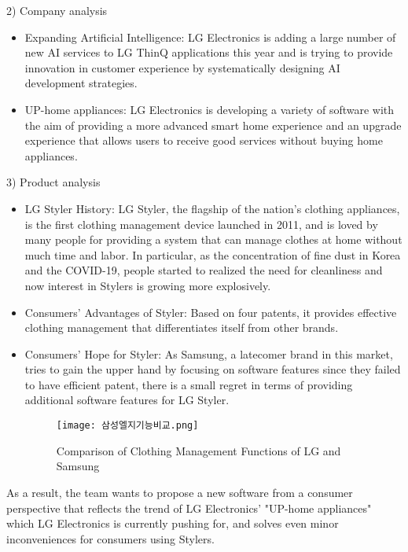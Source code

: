 \documentclass[conference]{IEEEtran}
\begin{document}
2) Company analysis
\begin{itemize}
    \item Expanding Artificial Intelligence: LG Electronics is adding a large number of new AI services to LG ThinQ applications this year and is trying to provide innovation in customer experience by systematically designing AI development strategies.\\
    \item UP-home appliances: LG Electronics is developing a variety of software with the aim of providing a more advanced smart home experience and an upgrade experience that allows users to receive good services without buying home appliances.\\
\end{itemize}

3) Product analysis
\begin{itemize}
    \item LG Styler History: LG Styler, the flagship of the nation's clothing appliances, is the first clothing management device launched in 2011, and is loved by many people for providing a system that can manage clothes at home without much time and labor. In particular, as the concentration of fine dust in Korea and the COVID-19, people started to realized the need for cleanliness and now interest in Stylers is growing more explosively.\\
    \item Consumers' Advantages of Styler: Based on four patents, it provides effective clothing management that differentiates itself from other brands.\\
    \item Consumers' Hope for Styler: As Samsung, a latecomer brand in this market, tries to gain the upper hand by focusing on software features since they failed to have efficient patent, there is a small regret in terms of providing additional software features for LG Styler.
    \begin{figure}[htbp]
        \centerline{\texttt{[image: 삼성엘지기능비교.png]}}
        \caption{Comparison of Clothing Management Functions of LG and Samsung}
        \label{fig}
    \end{figure}
    
\end{itemize}
As a result, the team wants to propose a new software from a consumer perspective that reflects the trend of LG Electronics' "UP-home appliances" which LG Electronics is currently pushing for, and solves even minor inconveniences for consumers using Stylers.\\
\end{document}
